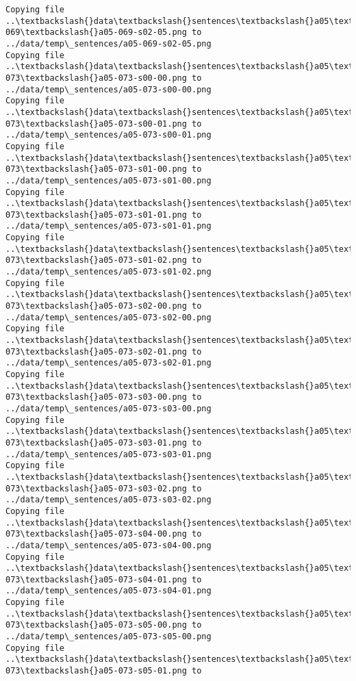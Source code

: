 \documentclass[11pt]{article}
\begin{document}
\begin{Verbatim}[commandchars=\\\{\}]
Copying file ..\textbackslash{}data\textbackslash{}sentences\textbackslash{}a05\textbackslash{}a05-069\textbackslash{}a05-069-s02-05.png to
../data/temp\_sentences/a05-069-s02-05.png
Copying file ..\textbackslash{}data\textbackslash{}sentences\textbackslash{}a05\textbackslash{}a05-073\textbackslash{}a05-073-s00-00.png to
../data/temp\_sentences/a05-073-s00-00.png
Copying file ..\textbackslash{}data\textbackslash{}sentences\textbackslash{}a05\textbackslash{}a05-073\textbackslash{}a05-073-s00-01.png to
../data/temp\_sentences/a05-073-s00-01.png
Copying file ..\textbackslash{}data\textbackslash{}sentences\textbackslash{}a05\textbackslash{}a05-073\textbackslash{}a05-073-s01-00.png to
../data/temp\_sentences/a05-073-s01-00.png
Copying file ..\textbackslash{}data\textbackslash{}sentences\textbackslash{}a05\textbackslash{}a05-073\textbackslash{}a05-073-s01-01.png to
../data/temp\_sentences/a05-073-s01-01.png
Copying file ..\textbackslash{}data\textbackslash{}sentences\textbackslash{}a05\textbackslash{}a05-073\textbackslash{}a05-073-s01-02.png to
../data/temp\_sentences/a05-073-s01-02.png
Copying file ..\textbackslash{}data\textbackslash{}sentences\textbackslash{}a05\textbackslash{}a05-073\textbackslash{}a05-073-s02-00.png to
../data/temp\_sentences/a05-073-s02-00.png
Copying file ..\textbackslash{}data\textbackslash{}sentences\textbackslash{}a05\textbackslash{}a05-073\textbackslash{}a05-073-s02-01.png to
../data/temp\_sentences/a05-073-s02-01.png
Copying file ..\textbackslash{}data\textbackslash{}sentences\textbackslash{}a05\textbackslash{}a05-073\textbackslash{}a05-073-s03-00.png to
../data/temp\_sentences/a05-073-s03-00.png
Copying file ..\textbackslash{}data\textbackslash{}sentences\textbackslash{}a05\textbackslash{}a05-073\textbackslash{}a05-073-s03-01.png to
../data/temp\_sentences/a05-073-s03-01.png
Copying file ..\textbackslash{}data\textbackslash{}sentences\textbackslash{}a05\textbackslash{}a05-073\textbackslash{}a05-073-s03-02.png to
../data/temp\_sentences/a05-073-s03-02.png
Copying file ..\textbackslash{}data\textbackslash{}sentences\textbackslash{}a05\textbackslash{}a05-073\textbackslash{}a05-073-s04-00.png to
../data/temp\_sentences/a05-073-s04-00.png
Copying file ..\textbackslash{}data\textbackslash{}sentences\textbackslash{}a05\textbackslash{}a05-073\textbackslash{}a05-073-s04-01.png to
../data/temp\_sentences/a05-073-s04-01.png
Copying file ..\textbackslash{}data\textbackslash{}sentences\textbackslash{}a05\textbackslash{}a05-073\textbackslash{}a05-073-s05-00.png to
../data/temp\_sentences/a05-073-s05-00.png
Copying file ..\textbackslash{}data\textbackslash{}sentences\textbackslash{}a05\textbackslash{}a05-073\textbackslash{}a05-073-s05-01.png to

\end{Verbatim}
\end{document}
